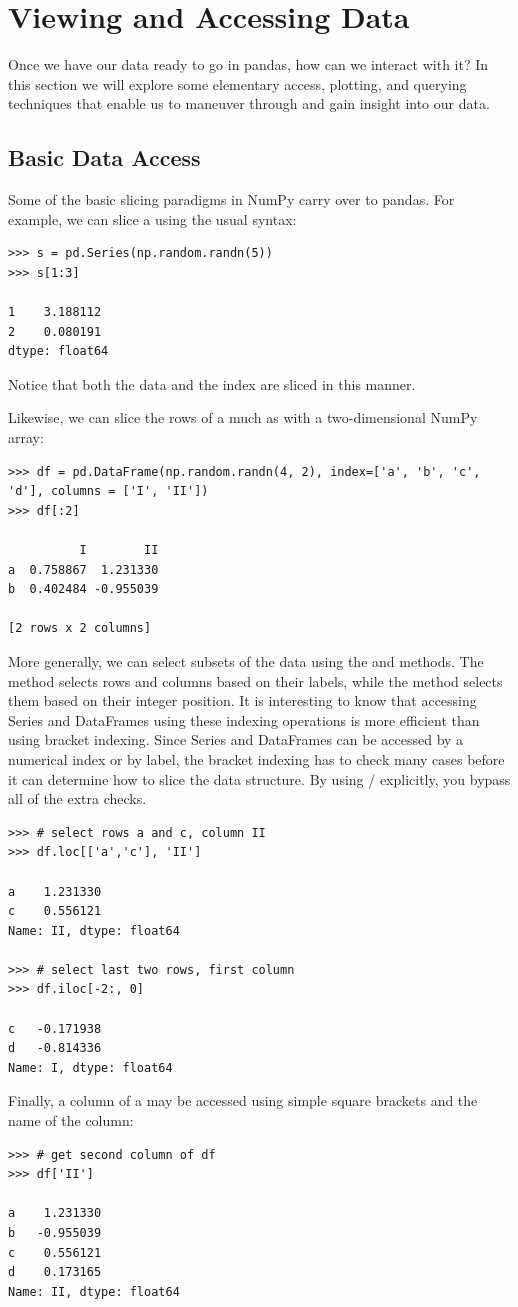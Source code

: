 \section*{Viewing and Accessing Data}

Once we have our data ready to go in pandas, how can we interact with it?
In this section we will explore some elementary access, plotting, and querying techniques that enable us to maneuver through
and gain insight into our data.

\subsection*{Basic Data Access}
Some of the basic slicing paradigms in NumPy carry over to pandas. 
For example, we can slice a  using the usual syntax:
\begin{lstlisting}
>>> s = pd.Series(np.random.randn(5))
>>> s[1:3]

1    3.188112
2    0.080191
dtype: float64
\end{lstlisting}
Notice that both the data and the index are sliced in this manner.

Likewise, we can slice the rows of a  much as with a two-dimensional NumPy array:
\begin{lstlisting}
>>> df = pd.DataFrame(np.random.randn(4, 2), index=['a', 'b', 'c', 'd'], columns = ['I', 'II'])
>>> df[:2]

          I        II
a  0.758867  1.231330
b  0.402484 -0.955039

[2 rows x 2 columns]
\end{lstlisting}

More generally, we can select subsets of the data using the  and  methods.
The  method selects rows and columns based on their labels, while the  method
selects them based on their integer position.
It is interesting to know that accessing Series and DataFrames using these indexing operations is more efficient than using bracket indexing.
Since Series and DataFrames can be accessed by a numerical index or by label, the bracket indexing has to check many cases before it can determine how to slice the data structure.
By using / explicitly, you bypass all of the extra checks.
\begin{lstlisting}
>>> # select rows a and c, column II
>>> df.loc[['a','c'], 'II']

a    1.231330
c    0.556121
Name: II, dtype: float64

>>> # select last two rows, first column
>>> df.iloc[-2:, 0]

c   -0.171938
d   -0.814336
Name: I, dtype: float64
\end{lstlisting}
Finally, a column of a  may be accessed using simple square brackets and the name of the column:
\begin{lstlisting}
>>> # get second column of df
>>> df['II']

a    1.231330
b   -0.955039
c    0.556121
d    0.173165
Name: II, dtype: float64
\end{lstlisting}

